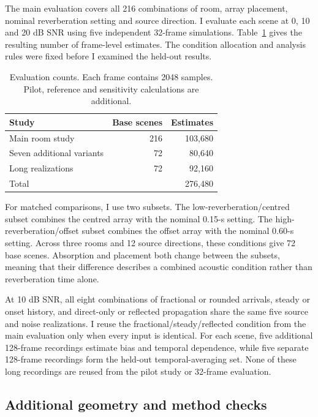 \documentclass{edpsci}
\begin{document}
The main evaluation covers all 216 combinations of room, array placement, nominal reverberation setting and source direction. I evaluate each scene at 0, 10 and 20 dB SNR using five independent 32-frame simulations. Table~\ref{tab:protocol} gives the resulting number of frame-level estimates. The condition allocation and analysis rules were fixed before I examined the held-out results.

\begin{table}[t]
	\caption{Evaluation counts. Each frame contains 2048 samples. Pilot, reference and sensitivity calculations are additional.}
	\label{tab:protocol}
	\centering
	\small
	\begin{tabular}{@{}lrr@{}}
		\toprule
		Study & Base scenes & Estimates\\
		\midrule
		Main room study & 216 & 103,680\\
		Seven additional variants & 72 & 80,640\\
		Long realizations & 72 & 92,160\\
		\midrule
		Total & & 276,480\\
		\bottomrule
	\end{tabular}
\end{table}

For matched comparisons, I use two subsets. The low-reverberation/centred subset combines the centred array with the nominal 0.15-s setting. The high-reverberation/offset subset combines the offset array with the nominal 0.60-s setting. Across three rooms and 12 source directions, these conditions give 72 base scenes. Absorption and placement both change between the subsets, meaning that their difference describes a combined acoustic condition rather than reverberation time alone.

At 10 dB SNR, all eight combinations of fractional or rounded arrivals, steady or onset history, and direct-only or reflected propagation share the same five source and noise realizations. I reuse the fractional/steady/reflected condition from the main evaluation only when every input is identical. For each scene, five additional 128-frame recordings estimate bias and temporal dependence, while five separate 128-frame recordings form the held-out temporal-averaging set. None of these long recordings are reused from the pilot study or 32-frame evaluation.

\subsection{Additional geometry and method checks}
\end{document}
